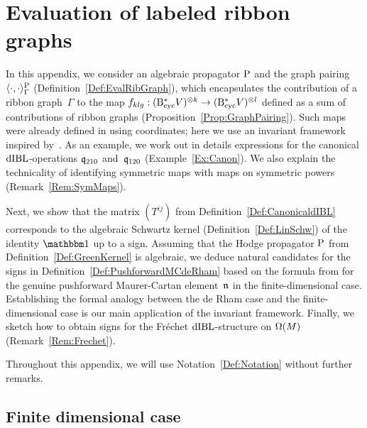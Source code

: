 \documentclass[\MainFolder/Text.tex]{subfiles}
\begin{document}
\chapter{Evaluation of labeled ribbon graphs}
\label{Section:Appendix}
In this appendix, we consider an algebraic propagator $\mathrm{P}$ and the graph pairing $\langle \cdot, \cdot \rangle^{\mathrm{P}}_\Gamma$ (Definition~\ref{Def:EvalRibGraph}), which encapsulates the contribution of a ribbon graph~$\Gamma$ to the map $f_{klg}: (\mathrm{B}_{\mathrm{cyc}}^* V)^{\otimes k} \rightarrow (\mathrm{B}_{\mathrm{cyc}}^* V)^{\otimes l}$ defined as a sum of contributions of ribbon graphs (Proposition~\ref{Prop:GraphPairing}). Such maps were already defined in \cite[Section 11]{Cieliebak2015} using coordinates; here we use an invariant framework inspired by~\cite{Mnev2017}. As an example, we work out in details expressions for the canonical $\mathrm{dIBL}$-operations $\mathfrak{q}_{210}$ and~$\mathfrak{q}_{120}$ (Example~\ref{Ex:Canon}). We also explain the technicality of identifying symmetric maps with maps on symmetric powers (Remark~\ref{Rem:SymMaps}).

Next, we show that the matrix $(T^{ij})$ from Definition~\ref{Def:CanonicaldIBL} corresponds to the algebraic Schwartz kernel (Definition~\ref{Def:LinSchw}) of the identity $\Id$ up to a sign. Assuming that the Hodge propagator $\mathrm{P}$ from Definition~\ref{Def:GreenKernel} is algebraic, we deduce natural candidates for the signs in Definition~\ref{Def:PushforwardMCdeRham} based on the formula from \cite[Remark 12.10]{Cieliebak2015} for the genuine pushforward Maurer-Cartan element~$\mathfrak{n}$ in the finite-dimensional case. Establishing the formal analogy between the de Rham case and the finite-dimensional case is our main application of the invariant framework. Finally, we sketch how to obtain signs for the Fr\'echet $\mathrm{dIBL}$-structure on $\Omega(M)$ (Remark~\ref{Rem:Frechet}).

Throughout this appendix, we will use Notation~\ref{Def:Notation} without further remarks.
%

\section{Finite dimensional case}
\end{document}
